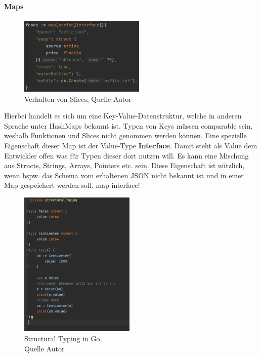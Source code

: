 \documentclass[12pt,titlepage]{article}
\begin{document}
\paragraph{Maps}
\begin{figure}
	\centering
	\includegraphics[width=6cm]{map-example}
	\caption{Verhalten von Slices, Quelle Autor}\label{map}
\end{figure}
Hierbei handelt es sich um eine Key-Value-Datenstruktur, welche in anderen Sprache unter HashMaps bekannt ist.
Typen von Keys müssen comparable sein, weshalb Funktionen und Slices nicht genommen werden können.
Eine spezielle Eigenschaft dieser Map ist der Value-Type \textbf{Interface}.
Damit steht als Value dem Entwickler offen was für Typen dieser dort nutzen will.
Es kann eine Mischung aus Structs, Strings, Arrays, Pointers etc. sein.
Diese Eigenschaft ist nützlich, wenn bspw. das Schema vom erhaltenen JSON nicht bekannt ist und in einer Map gespeichert werden soll.
map interface!

\begin{figure}
	\centering
	\includegraphics[width=5.5cm]{structuralTyping}
	\caption{Structural Typing in Go, \\Quelle Autor}\label{structuralTyping}
\end{figure}
\end{document}
